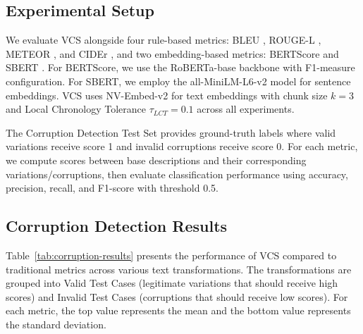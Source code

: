 \documentclass[letterpaper]{article} %
\begin{document}
\subsection{Experimental Setup}

We evaluate VCS alongside four rule-based metrics: BLEU \citep{p:02}, ROUGE-L \citep{l:04}, METEOR \citep{bl:05}, and CIDEr \citep{v:15}, and two embedding-based metrics: BERTScore \citep{z:20} and SBERT \citep{r:19}. For BERTScore, we use the RoBERTa-base backbone with F1-measure configuration. For SBERT, we employ the all-MiniLM-L6-v2 model for sentence embeddings. VCS uses NV-Embed-v2 for text embeddings with chunk size $k=3$ and Local Chronology Tolerance $\tau_{LCT}=0.1$ across all experiments.

The Corruption Detection Test Set provides ground-truth labels where valid variations receive score 1 and invalid corruptions receive score 0. For each metric, we compute scores between base descriptions and their corresponding variations/corruptions, then evaluate classification performance using accuracy, precision, recall, and F1-score with threshold 0.5.

\subsection{Corruption Detection Results}

Table~\ref{tab:corruption-results} presents the performance of VCS compared to traditional metrics across various text transformations. The transformations are grouped into Valid Test Cases (legitimate variations that should receive high scores) and Invalid Test Cases (corruptions that should receive low scores). For each metric, the top value represents the mean and the bottom value represents the standard deviation.
\end{document}
